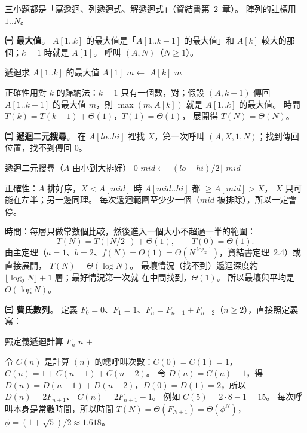 \begin{pastsoln}
三小題都是「寫遞迴、列遞迴式、解遞迴式」（資結書第~2~章）。 陣列的註標用 $1..N$。

\textbf{㈠ 最大值}。 $A[1..k]$ 的最大值是「$A[1..k-1]$ 的最大值」和 $A[k]$ 較大的那個；$k = 1$ 時就是
$A[1]$。 呼叫 $(A, N)$（$N \ge 1$）。
\begin{pseudo}[unbreakable]{遞迴求 $A[1..k]$ 的最大值}
        \State \Return $A[1]$
    \EndIf
    \State $m \gets$ 
        \State \Return $A[k]$
    \Else
        \State \Return $m$
    \EndIf
\EndFunction
\end{pseudo}
正確性用對 $k$ 的歸納法：$k = 1$ 只有一個數，對；假設 $(A, k-1)$ 傳回 $A[1..k-1]$ 的最大值
$m$，則 $\max(m, A[k])$ 就是 $A[1..k]$ 的最大值。 時間 $T(k) = T(k-1) + \Theta(1)$，$T(1) = \Theta(1)$，
展開得 $T(N) = \Theta(N)$。

\textbf{㈡ 遞迴二元搜尋}。 在 $A[\mathit{lo}..\mathit{hi}]$ 裡找 $X$，第一次呼叫
$(A, X, 1, N)$；找到傳回位置，找不到傳回 $0$。
\begin{pseudo}[unbreakable]{遞迴二元搜尋（$A$ 由小到大排好）}
        \State \Return $0$ 
    \EndIf
    \State $\mathit{mid} \gets \lfloor (\mathit{lo} + \mathit{hi}) / 2 \rfloor$
        \State \Return $\mathit{mid}$
        \State \Return {}
    \Else
        \State \Return {}
    \EndIf
\EndFunction
\end{pseudo}
正確性：$A$ 排好序，$X < A[\mathit{mid}]$ 時 $A[\mathit{mid}..\mathit{hi}]$ 都 $\ge A[\mathit{mid}] > X$，
$X$ 只可能在左半；另一邊同理。 每次遞迴範圍至少少一個（$\mathit{mid}$ 被排除），所以一定會停。

時間：每層只做常數個比較，然後進入一個大小不超過一半的範圍：
\[
T(N) = T(\lfloor N/2 \rfloor) + \Theta(1),\qquad T(0) = \Theta(1).
\]
由主定理（$a = 1$、$b = 2$、$f(N) = \Theta(1) = \Theta(N^{\log_2 1})$，資結書定理~2.4）或直接展開，
$T(N) = \Theta(\log N)$。 最壞情況（找不到）遞迴深度約 $\lfloor \log_2 N \rfloor + 1$ 層；最好情況第一次就
在中間找到，$\Theta(1)$。 所以最壞與平均是 $O(\log N)$。

\textbf{㈢ 費氏數列}。 定義 $F_0 = 0$、$F_1 = 1$、$F_n = F_{n-1} + F_{n-2}$（$n \ge 2$），直接照定義寫：
\begin{pseudo}[unbreakable]{照定義遞迴計算 $F_n$}
        \State \Return $n$
    \EndIf
    \State \Return {} $+$ 
\EndFunction
\end{pseudo}
令 $C(n)$ 是計算 $(n)$ 的總呼叫次數：$C(0) = C(1) = 1$，$C(n) = 1 + C(n-1) + C(n-2)$。 令
$D(n) = C(n) + 1$，得 $D(n) = D(n-1) + D(n-2)$，$D(0) = D(1) = 2$，所以 $D(n) = 2F_{n+1}$、
$C(n) = 2F_{n+1} - 1$。 例如 $C(5) = 2 \cdot 8 - 1 = 15$。 每次呼叫本身是常數時間，所以時間
$T(N) = \Theta(F_{N+1}) = \Theta(\phi^{N})$，$\phi = (1 + \sqrt 5)/2 \approx 1.618$。


\end{pastsoln}
